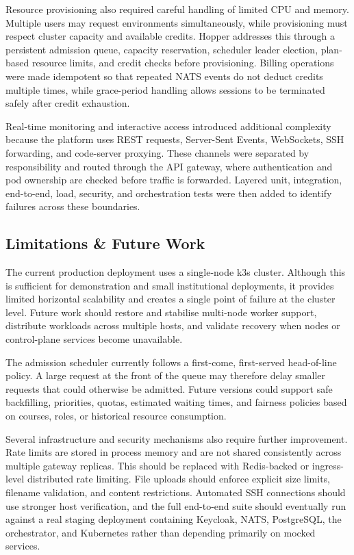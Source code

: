 \documentclass[12pt,a4paper]{article}
\begin{document}
Resource provisioning also required careful handling of limited CPU and memory. Multiple
users may request environments simultaneously, while provisioning must respect cluster
capacity and available credits. Hopper addresses this through a persistent admission
queue, capacity reservation, scheduler leader election, plan-based resource limits, and
credit checks before provisioning. Billing operations were made idempotent so that
repeated NATS events do not deduct credits multiple times, while grace-period handling
allows sessions to be terminated safely after credit exhaustion.

Real-time monitoring and interactive access introduced additional complexity because the
platform uses REST requests, Server-Sent Events, WebSockets, SSH forwarding, and
code-server proxying. These channels were separated by responsibility and routed through
the API gateway, where authentication and pod ownership are checked before traffic is
forwarded. Layered unit, integration, end-to-end, load, security, and orchestration tests
were then added to identify failures across these boundaries.

\subsection{Limitations \& Future Work}

The current production deployment uses a single-node k3s cluster. Although this is
sufficient for demonstration and small institutional deployments, it provides limited
horizontal scalability and creates a single point of failure at the cluster level. Future
work should restore and stabilise multi-node worker support, distribute workloads across
multiple hosts, and validate recovery when nodes or control-plane services become
unavailable.

The admission scheduler currently follows a first-come, first-served head-of-line policy.
A large request at the front of the queue may therefore delay smaller requests that could
otherwise be admitted. Future versions could support safe backfilling, priorities, quotas,
estimated waiting times, and fairness policies based on courses, roles, or historical
resource consumption.

Several infrastructure and security mechanisms also require further improvement. Rate
limits are stored in process memory and are not shared consistently across multiple
gateway replicas. This should be replaced with Redis-backed or ingress-level distributed
rate limiting. File uploads should enforce explicit size limits, filename validation, and
content restrictions. Automated SSH connections should use stronger host verification,
and the full end-to-end suite should eventually run against a real staging deployment
containing Keycloak, NATS, PostgreSQL, the orchestrator, and Kubernetes rather than
depending primarily on mocked services.
\end{document}
